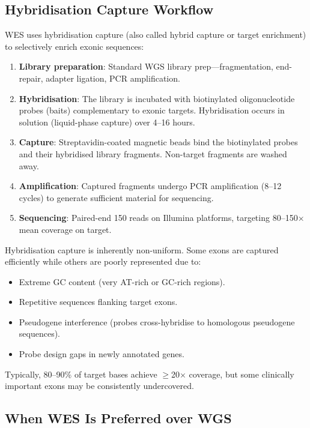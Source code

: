 \subsection{Hybridisation Capture Workflow}

WES uses hybridisation capture (also called hybrid capture or target enrichment) to selectively enrich exonic sequences:

\begin{enumerate}[nosep]
  \item \textbf{Library preparation}: Standard WGS library prep---fragmentation, end-repair, adapter ligation, PCR amplification.
  \item \textbf{Hybridisation}: The library is incubated with biotinylated oligonucleotide probes (baits) complementary to exonic targets. Hybridisation occurs in solution (liquid-phase capture) over 4--16 hours.
  \item \textbf{Capture}: Streptavidin-coated magnetic beads bind the biotinylated probes and their hybridised library fragments. Non-target fragments are washed away.
  \item \textbf{Amplification}: Captured fragments undergo PCR amplification (8--12 cycles) to generate sufficient material for sequencing.
  \item \textbf{Sequencing}: Paired-end 150\basepair{} reads on Illumina platforms, targeting 80--150$\times$ mean coverage on target.
\end{enumerate}

\begin{warningbox}[title={WES Uniformity Challenges}]
Hybridisation capture is inherently non-uniform. Some exons are captured efficiently while others are poorly represented due to:
\begin{itemize}[nosep]
  \item Extreme GC content (very AT-rich or GC-rich regions).
  \item Repetitive sequences flanking target exons.
  \item Pseudogene interference (probes cross-hybridise to homologous pseudogene sequences).
  \item Probe design gaps in newly annotated genes.
\end{itemize}
Typically, 80--90\% of target bases achieve $\geq$20$\times$ coverage, but some clinically important exons may be consistently undercovered.
\end{warningbox}

\subsection{When WES Is Preferred over WGS}

